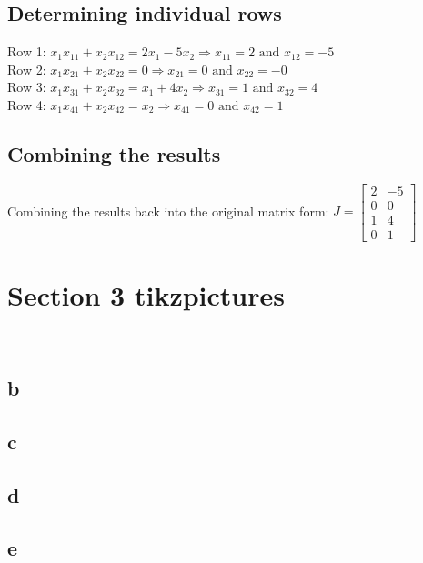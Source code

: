 \documentclass{article}
\begin{document}
\subsection{Determining individual rows}
Row 1: $x_1x_{11}+x_2x_{12}=2x_1-5x_2 \Rightarrow x_{11}=2\text{ and }x_{12}=-5$
\\[0.05in]Row 2: $x_1x_{21}+x_2x_{22}=0 \Rightarrow x_{21}=0\text{ and }x_{22}=-0$
\\[0.05in]Row 3: $x_1x_{31}+x_2x_{32}=x_1+4x_2 \Rightarrow x_{31}=1\text{ and }x_{32}=4$
\\[0.05in]Row 4: $x_1x_{41}+x_2x_{42}=x_2 \Rightarrow x_{41}=0\text{ and }x_{42}=1$
\subsection{Combining the results}
Combining the results back into the original matrix form:
$J=\begin{bmatrix}2&-5\\0&0\\1&4\\0&1\end{bmatrix}$
\pagebreak
\section{Section 3 tikzpictures}
\label{sec:intro}
\scalebox{0.5}{ }
\\\scalebox{0.5}{ }
\pagebreak
\subsection{b}
\label{sec:b} 
{} 
\pagebreak
\subsection{c}
\label{sec:c}
{}
\pagebreak
\subsection{d}
\label{sec:d}
{}
\pagebreak
\subsection{e}
\label{sec:e}
{}
\end{document}
